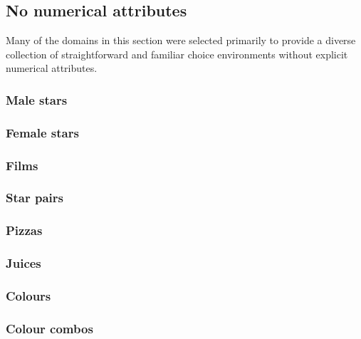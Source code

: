 \documentclass[11pt,letter]{article}
\begin{document}
\subsection{No numerical attributes}

Many of the domains in this section were selected primarily to provide a diverse collection of straightforward and familiar choice environments without explicit numerical attributes.

\subsubsection{Male stars}



\subsubsection{Female stars}



\subsubsection{Films}



\subsubsection{Star pairs}



\subsubsection{Pizzas}



\subsubsection{Juices}



\subsubsection{Colours}



\subsubsection{Colour combos}
\end{document}
